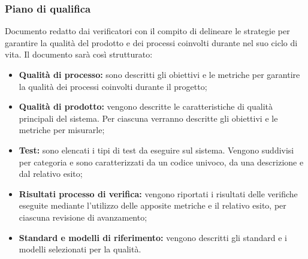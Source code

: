 \subsubsection{Piano di qualifica}
Documento redatto dai verificatori con il compito di delineare le strategie per garantire la qualità del prodotto e dei processi coinvolti durante nel suo ciclo di vita. Il documento sarà così strutturato:
\begin{itemize}
  \item \textbf{Qualità di processo:} sono descritti gli obiettivi e le metriche per garantire la qualità dei processi coinvolti durante il progetto;
  \item \textbf{Qualità di prodotto:} vengono descritte le caratteristiche di qualità principali del sistema. Per ciascuna verranno descritte gli obiettivi e le metriche per misurarle;
  \item \textbf{Test:} sono elencati i tipi di test da eseguire sul sistema. Vengono suddivisi per categoria e sono caratterizzati da un codice univoco, da una descrizione e dal relativo esito;
  \item \textbf{Risultati processo di verifica:} vengono riportati i risultati delle verifiche eseguite mediante l'utilizzo delle apposite metriche e il relativo esito, per ciascuna revisione di avanzamento;
  \item \textbf{Standard e modelli di riferimento:} vengono descritti gli standard e i modelli selezionati per la qualità.
\end{itemize}
